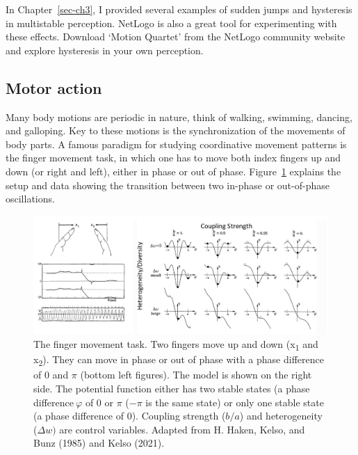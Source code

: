 \documentclass[
  a4paper,
  DIV=11,
  numbers=noendperiod]{scrreprt}
\begin{document}
In Chapter~\ref{sec-ch3}, I provided several examples of sudden jumps
and hysteresis in multistable perception. NetLogo is also a great tool
for experimenting with these effects. Download `Motion Quartet' from the
NetLogo community website and explore hysteresis in your own perception.

\hypertarget{sec-Motor-action}{%
\subsection{Motor action}\label{sec-Motor-action}}

Many body motions are periodic in nature, think of walking, swimming,
dancing, and galloping. Key to these motions is the synchronization of
the movements of body parts. A famous paradigm for studying coordinative
movement patterns is the finger movement task, in which one has to move
both index fingers up and down (or right and left), either in phase or
out of phase. Figure~\ref{fig-ch5n-img7-old-45} explains the setup and
data showing the transition between two in-phase or out-of-phase
oscillations.

\begin{figure}

{\centering \includegraphics{media/ch5n/image7.jpg}

}

\caption{\label{fig-ch5n-img7-old-45}The finger movement task. Two
fingers move up and down (x\textsubscript{1} and x\textsubscript{2}).
They can move in phase or out of phase with a phase difference of 0 and
\(\pi\) (bottom left figures). The model is shown on the right side. The
potential function either has two stable states (a phase
difference\(\ \varphi\) of 0 or \(\pi\) (\(- \pi\) is the same state) or
only one stable state (a phase difference of 0). Coupling strength
(\(b/a\)) and heterogeneity (\(\Delta w)\) are control variables.
Adapted from H. Haken, Kelso, and Bunz (1985) and Kelso (2021).}

\end{figure}
\end{document}
